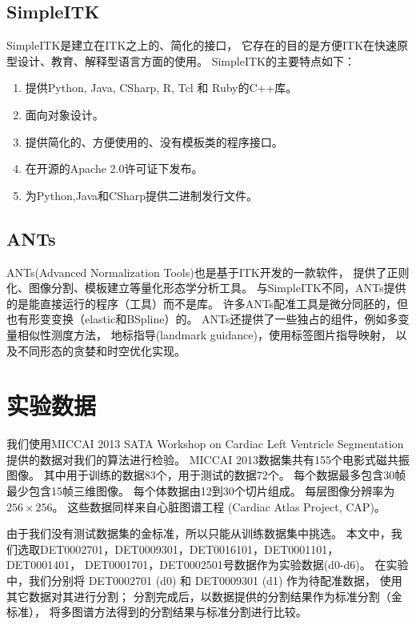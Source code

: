 \subsection{SimpleITK}
SimpleITK是建立在ITK之上的、简化的接口，
它存在的目的是方便ITK在快速原型设计、教育、解释型语言方面的使用。
SimpleITK的主要特点如下：
\begin{enumerate}
\item 提供Python, Java, CSharp, R, Tcl 和 Ruby的C++库。
\item 面向对象设计。
\item 提供简化的、方便使用的、没有模板类的程序接口。
\item 在开源的Apache 2.0许可证下发布。
\item 为Python,Java和CSharp提供二进制发行文件。
\end{enumerate}

\subsection{ANTs}
ANTs(Advanced Normalization Tools)也是基于ITK开发的一款软件，
提供了正则化、图像分割、模板建立等量化形态学分析工具。
与SimpleITK不同，ANTs提供的是能直接运行的程序（工具）而不是库。
许多ANTs配准工具是微分同胚的，但也有形变变换（elastic和BSpline）的。
ANTs还提供了一些独占的组件，例如多变量相似性测度方法，
地标指导(landmark guidance)，使用标签图片指导映射，
以及不同形态的贪婪和时空优化实现。

\section{实验数据}

我们使用MICCAI 2013 SATA Workshop on  Cardiac Left Ventricle Segmentation
提供的数据对我们的算法进行检验。
MICCAI 2013数据集共有155个电影式磁共振图像。
其中用于训练的数据83个，用于测试的数据72个。
每个数据最多包含30帧最少包含15帧三维图像。
每个体数据由12到30个切片组成。
每层图像分辨率为$256\times256$。
这些数据同样来自心脏图谱工程
(Cardiac Atlas Project, CAP)。

由于我们没有测试数据集的金标准，所以只能从训练数据集中挑选。
本文中，我们选取DET0002701，DET0009301，DET0016101，DET0001101，DET0001401，
DET0001701，DET0002501号数据作为实验数据(d0-d6)。
在实验中，我们分别将 DET0002701 (d0) 和 DET0009301 (d1) 作为待配准数据，
使用其它数据对其进行分割；
分割完成后，以数据提供的分割结果作为标准分割（金标准），
将多图谱方法得到的分割结果与标准分割进行比较。


